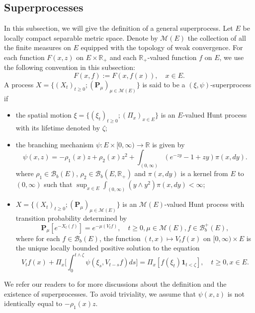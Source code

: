\documentclass[12pt,a4paper]{amsart}
\theoremstyle{plain}
\theoremstyle{definition}
\numberwithin{equation}{section}
\begin{document}
\subsection{Superprocesses}
\label{sec: definition of superprocess}
In this subsection, we will give the definition of a general superprocess.
Let $E$ be locally compact separable metric space. Denote by $\mathcal M(E)$ the collection of all the finite measures on $E$ equipped with the topology of weak convergence.
For each function $F(x,z)$ on $E\times \mathbb R_+$ and each $\mathbb R_+$-valued function $f$ on $E$, we use the following convention in this subsection:
\[
  F(x,f):= F(x,f(x)),\quad x\in E.
\]
A process $X=\{(X_t)_{t\geq 0}; (\mathbf P_\mu)_{\mu \in \mathcal M(E)}\}$ is said to be a $(\xi,\psi)$-superprocess if
\begin{itemize}
\item
  the spatial motion $\xi=\{(\xi_t)_{t\geq 0};(\Pi_x)_{x\in E}\}$ is an $E$-valued Hunt process with its lifetime denoted by $\zeta$;
\item
  the branching mechanism $\psi: E\times[0,\infty) \to \mathbb R$ is given by
\begin{equation}
  \label{eq: branching mechanism}
  \psi(x,z)=
  -\rho_1(x) z + \rho_2 (x) z^2 + \int_{(0,\infty)} (e^{-zy} - 1 + zy) \pi(x,dy).
\end{equation}
where $\rho_1 \in \mathcal B_b(E)$, $\rho_2 \in \mathcal B_b(E, \mathbb R_+)$ and $\pi(x,dy)$ is a kernel from $E$ to $(0,\infty)$ such that $\sup_{x\in E} \int_{(0,\infty)} (y\wedge y^2) \pi(x,dy) < \infty$;
\item
  $X=\{(X_t)_{t\geq 0}; (\mathbf P_\mu)_{\mu \in \mathcal M(E)}\}$ is an $\mathcal M(E)$-valued Hunt process with transition probability determined by
  \begin{equation}
    \mathbf P_\mu [e^{-X_t(f)}] = e^{-\mu(V_tf)},
    \quad t\geq 0, \mu \in \mathcal M(E), f\in \mathcal B^+_b(E),
  \end{equation}
  where for each $f\in \mathcal B_b(E)$, the function $(t,x)\mapsto V_tf(x)$ on $[0,\infty) \times E$ is the unique locally bounded positive solution to the equation
  \begin{equation}
    \label{eq:FKPP_in_definition}
    V_tf(x) + \Pi_x \Big[  \int_0^{t\wedge \zeta} \psi(\xi_s,V_{t-s}f)ds \Big]
    = \Pi_x [ f(\xi_t)\mathbf 1_{t<\zeta} ],
    \quad t \geq 0, x \in E.
  \end{equation}
\end{itemize}
We refer our readers to \cite{Li2011Measure-valued} for more discussions about the definition and the existence of superprocesses.
To avoid triviality, we assume that $\psi(x,z)$ is not identically equal to $-\rho_1(x)z$.
\end{document}
